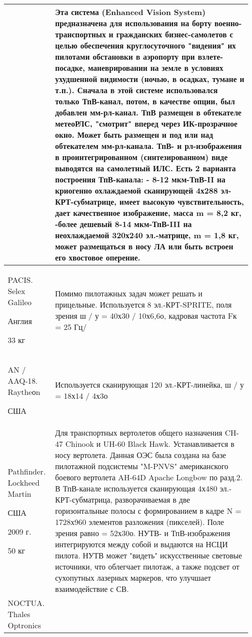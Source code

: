\begin{landscape}
\begin{longtable}{| p{6cm} | p{18cm} |}
& 
Эта система (Enhanced Vision System) предназначена для использования на борту военно-транспортных и гражданских бизнес-самолетов с целью обеспечения круглосуточного "видения" их пилотами обстановки в аэропорту при взлете-посадке, маневрировании на земле в условиях ухудшенной видимости (ночью, в осадках, тумане и т.п.). 
Сначала в этой системе использовался только ТпВ-канал, потом, в качестве опции, был добавлен мм-рл-канал. ТпВ размещен в обтекателе метеоРЛС, "смотрит" вперед через ИК-прозрачное окно. Может быть размещен и под или над обтекателем мм-рл-канала. ТпВ- и рл-изображения в проинтегрированном (синтезированном) виде выводятся на самолетный ИЛС. Есть 2 варианта построения ТпВ-канала: - 8-12 мкм-ТпВ-II на криогенно охлаждаемой сканирующей 4х288 эл-КРТ-субматрице, имеет высокую чувствительность, дает качественное изображение, масса m = 8,2 кг, 
-более дешевый 8-14 мкм-ТпВ-III на неохлаждаемой 320х240 эл.-матрице, m = 1,8 кг, может размещаться в носу ЛА или быть встроен его хвостовое оперение.
    
\\ \hline
		PACIS. Selex Galileo
		
		Англия		
		
		33 кг        
& 
Помимо пилотажных задач может решать и прицельные. Используется 8 эл.-КРТ-SPRITE, поля зрения ш / у = 40х30 / 10х6,6о, кадровая частота Fк = 25 Гц/   
\\ \hline
	AN / AAQ-18. Raytheоn	
	
	США		       
& 
Используется сканирующая 120 эл.-КРТ-линейка, ш / у = 18х14 / 4х3о   
\\ \hline
	Pathfinder. Lockheed Martin	
	
	США	
	
	2009 г.	
	
	50 кг        
& 
Для транспортных вертолетов общего назначения CH-47 Chinook и UH-60 Black Hawk. Устанавливается в носу вертолета.
Данная ОЭС была создана на базе пилотажной подсистемы "M-PNVS" американского боевого вертолета AH-64D Apache Longbow по разд.2. В ТпВ-канале используется сканирующая 4х480 эл.-КРТ-субматрица, разворачиваемая в две горизонтальные полосы с формированием в кадре N = 1728х960 элементов разложения (пикселей). Поле зрения равно = 52х30о. НУТВ- и ТпВ-изображения интегрируются между собой и выдаются на НСЦИ пилота. НУТВ может "видеть" искусственные световые источники, что облегчает пилотаж, а также подсвет от сухопутных лазерных маркеров, что улучшает взаимодействие с СВ. 
    
\\ \hline
	NOCTUA. Thales Optronics	
	

\end{longtable}
\end{landscape}
